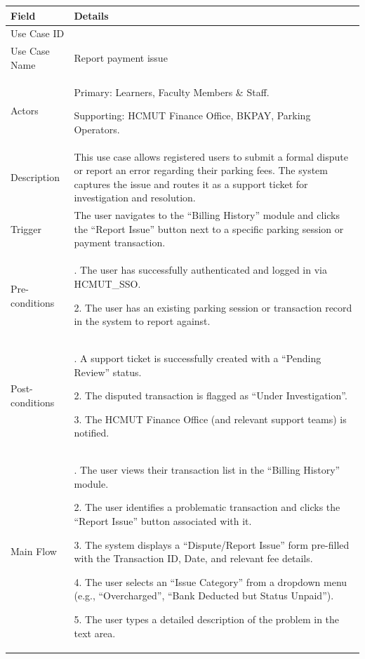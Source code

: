 \begin{table}[H]
\small
\renewcommand{\arraystretch}{1.4}
\begin{tabularx}{\textwidth}{|>{\raggedright\arraybackslash}p{3.5cm}|>{\RaggedRight\arraybackslash}X|}
\hline
\rowcolor{gray!20} \textbf{Field} & \textbf{Details} \\
\hline
Use Case ID & 3.6 \\
\hline
Use Case Name & Report payment issue \\
\hline
Actors & Primary: Learners, Faculty Members \& Staff. \par Supporting: HCMUT Finance Office, BKPAY, Parking Operators. \\
\hline
Description & This use case allows registered users to submit a formal dispute or report an error regarding their parking fees. The system captures the issue and routes it as a support ticket for investigation and resolution. \\
\hline
Trigger & The user navigates to the ``Billing History'' module and clicks the ``Report Issue'' button next to a specific parking session or payment transaction. \\
\hline
Pre-conditions & 1. The user has successfully authenticated and logged in via HCMUT\_SSO. \par 2. The user has an existing parking session or transaction record in the system to report against. \\
\hline
Post-conditions & 1. A support ticket is successfully created with a ``Pending Review'' status. \par 2. The disputed transaction is flagged as ``Under Investigation''. \par 3. The HCMUT Finance Office (and relevant support teams) is notified. \\
\hline
Main Flow & 
1. The user views their transaction list in the ``Billing History'' module. \par
2. The user identifies a problematic transaction and clicks the ``Report Issue'' button associated with it. \par
3. The system displays a ``Dispute/Report Issue'' form pre-filled with the Transaction ID, Date, and relevant fee details. \par
4. The user selects an ``Issue Category'' from a dropdown menu (e.g., ``Overcharged'', ``Bank Deducted but Status Unpaid''). \par
5. The user types a detailed description of the problem in the text area. \par

\end{tabularx}
\end{table}
